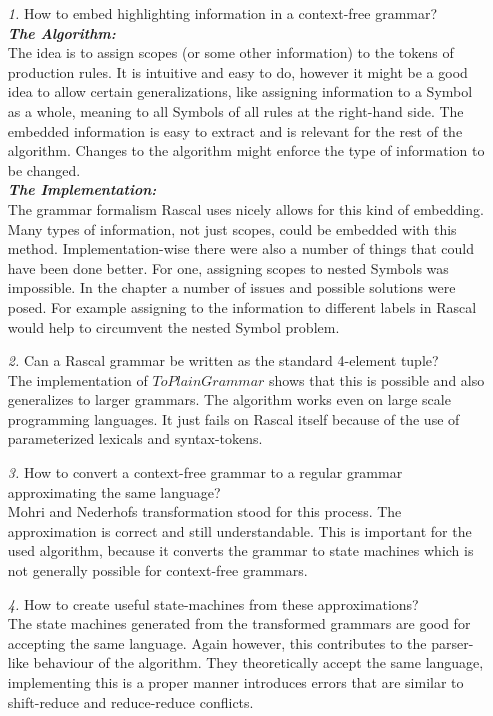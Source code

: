\begin{enumerate}
	\item[\textit{1.}] How to embed highlighting information in a context-free grammar?
	\\\textbf{\textit{The Algorithm:}}\\
	The idea is to assign scopes (or some other information) to the tokens of production rules. It is intuitive and easy to do, however it might be a good idea to allow certain generalizations, like assigning information to a Symbol as a whole, meaning to all Symbols of all rules at the right-hand side. The embedded information is easy to extract and is relevant for the rest of the algorithm. Changes to the algorithm might enforce the type of information to be changed.
	\\\textbf{\textit{The Implementation:}}\\
	The grammar formalism Rascal uses nicely allows for this kind of embedding. Many types of information, not just scopes, could be embedded with this method. Implementation-wise there were also a number of things that could have been done better. For one, assigning scopes to nested Symbols was impossible. In the  chapter a number of issues and possible solutions were posed. For example assigning to the information to different labels in Rascal would help to circumvent the nested Symbol problem. 
	
	\item[\textit{2.}] Can a Rascal grammar be written as the standard 4-element tuple?\\
	The implementation of $ToPlainGrammar$ shows that this is possible and also generalizes to larger grammars. The algorithm works even on large scale programming languages. It just fails on Rascal itself because of the use of parameterized lexicals and syntax-tokens.
	
	\item[\textit{3.}] How to convert a context-free grammar to a regular grammar approximating the same language?\\
	Mohri and Nederhofs transformation stood for this process. The approximation is correct and still understandable. This is important for the used algorithm, because it converts the grammar to state machines which is not generally possible for context-free grammars.
	
	\item[\textit{4.}] How to create useful state-machines from these approximations?\\
	The state machines generated from the transformed grammars are good for accepting the same language. Again however, this contributes to the parser-like behaviour of the algorithm. They theoretically accept the same language, implementing this is a proper manner introduces errors that are similar to shift-reduce and reduce-reduce conflicts.
	

\end{enumerate}
